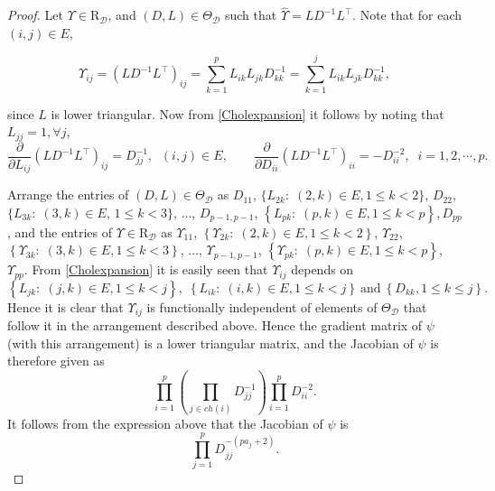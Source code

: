 \documentclass[12pt]{article}
\newcommand{\D}{\mathcal{D}}
\theoremstyle{plain}
\theoremstyle{definition}
\theoremstyle{remark}
\begin{document}
\begin{proof}

\noindent Let $\Upsilon \in \mathrm{R}_{\D}$, and $(D, L)\in \Theta_{\D}$  such that  $\widehat{\Upsilon}=LD^{-1}L^{\top}$. Note that for each $(i,j)\in E$,

\begin{equation} \label{Cholexpansion}
\Upsilon_{ij} = (LD^{-1}L^{\top})_{ij} = \sum_{k=1}^{p} L_{ik} L_{jk} D_{kk}^{-1} = \sum_{k=1}^j L_{ik} L_{jk} D_{kk}^{-1},
\end{equation}

\noindent
since $L$ is lower triangular. Now from  \eqref{Cholexpansion} it follows by noting that $L_{jj} = 1, \forall j $,
$$
\frac{\partial}{\partial L_{ij}} (LD^{-1}L^{\top})_{ij} = D^{-1}_{jj}, \;\;(i,j) \in E, \quad \quad \frac{\partial}{\partial D_{ii}} (LD^{-1}L^{\top})_{ii} = -D^{-2}_{ii}, \;\;i=1,2,\cdots,p.
$$

\noindent
Arrange the entries of $(D, L)\in { \Theta}_{\D}$ as $D_{11}$, $\{L_{2k}: \;$$
(2,k) \in E, 1 \leq k < 2\}$, $D_{22}$, $\{L_{3k}: \; (3,k) \in E$, $1 \leq k < 3\}$, $\ldots$,
$D_{p-1,p-1}$, $\left\{L_{pk}: \; (p,k) \in E, 1 \leq k < p\right\}, D_{pp}$,
and the entries of $\Upsilon \in \mathrm{R}_{\D}$ as $\Upsilon_{11}$, $\left\{\Upsilon_{2k}: \; (2,k)
\in E, 1 \leq k < 2\right\}$, $\Upsilon_{22}$, $\left\{\Upsilon_{3k}: \; (3,k) \in E, 1 \leq k <
3\right\}$, $\ldots$, $\Upsilon_{p-1,p-1}$, $\left\{\Upsilon_{pk}: \; (p,k) \in E, 1 \leq k < p\right\}$, $\Upsilon_{pp}$.
From \eqref{Cholexpansion} it is easily seen that $\Upsilon_{ij}$ depends on
 \[\left\{L_{jk}: \; (j,k) \in E, 1 \leq k < j\right\},\; \left\{ L_{ik}: \; (i,k) \in E, 1 \leq k < j \right\} \: \text{and}
  \: \left\{D_{kk}, 1 \leq k \leq j\right\}.
 \]
  \noindent Hence it is clear that $\Upsilon_{ij}$
is functionally independent of elements of $\Theta_{\D}$ that follow it in the arrangement described
above. Hence the gradient matrix of $\psi$ (with this arrangement) is a lower triangular matrix,
and the Jacobian of $\psi$ is therefore given as
$$
\prod_{i=1}^{p} \left(\prod_{j\in ch(i)} D_{jj}^{-1}\right)\prod^{p}_{i=1}D^{-2}_{ii}.
$$
\noindent
It follows from the expression above that the Jacobian of  $\psi$ is
\[
\prod_{j=1}^{p} D_{jj}^{-(pa_j+2)}.
\]
\end{proof}
%

%
\end{document}
